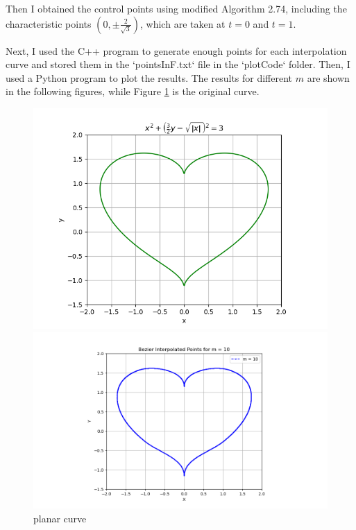 \documentclass[a4paper]{article}
\begin{document}
Then I obtained the control points using modified Algorithm 2.74, including the characteristic points \((0, \pm \frac{2}{\sqrt{3}})\), which are taken at \( t = 0 \) and \( t = 1 \).

Next, I used the C++ program to generate enough points for each interpolation curve and stored them in the `pointsInF.txt` file in the `plotCode` folder. Then, I used a Python program to plot the results. The results for different \(m\) are shown in the following figures, while Figure \ref{fig:planar curve} is the original curve.
\begin{figure}[ht]
  \centering
  \begin{minipage}[b]{0.45\textwidth}
    \centering
    \includegraphics[width=\textwidth]{figures/bezier0.png}
    \caption{planar curve}
    \label{fig:planar curve}
  \end{minipage}
  \hfill
  \begin{minipage}[b]{0.45\textwidth}
    \centering
    \includegraphics[width=\textwidth]{figures/bezier_update1.png}

\end{minipage}
\end{figure}
\end{document}

